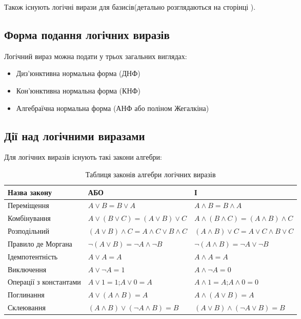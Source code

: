 Також існують логічні вирази для базисів(детально розглядаються на сторінці  \pageref{subsect:logic_basis}).
\newpage
\subsection{Форма подання логічних виразів}
Логічний вираз можна подати у трьох загальних виглядах:
\begin{itemize}
	\item Диз'юнктивна нормальна форма (ДНФ)
	\item Кон'юнктивна нормальна форма (КНФ)
	\item Алгебраїчна нормальна форма (АНФ або поліном Жегалкіна)
\end{itemize}
\newpage
\subsection{Дії над логічними виразами}
Для логічних виразів існують такі закони алгебри:
\begin{center}
\begin{table}[h!]
\begin{tabu} { | X[3,с] | X[3,c] | X[3,c] | }
 \hline
Назва закону& АБО & І \\
 \hline
 Переміщення &$A \lor B = B \lor A$  &$A \wedge B = B \wedge A $  \\
\hline
 Комбінування &$A \lor (B \lor C)= (A \lor B) \lor C $  &$A \wedge (B \wedge C)= (A \wedge B) \wedge C $  \\
\hline
Розподільний &$(A \lor B) \wedge C= A \wedge C \lor B \wedge C $  \vspace{1mm}&$(A \wedge B) \lor C= A \lor C \wedge B \lor C $ \vspace{1mm}   \\
\hline
Правило де Моргана & $\neg(A \lor B) = \neg A \wedge \neg B$& $\neg(A \wedge B) = \neg A \lor \neg B$\\
\hline
Ідемпотентність & $A \lor A = A$ &$A \wedge A = A $   \\
\hline
Виключення &$A \lor \neg A = 1$ & $A \wedge \neg A = 0$  \\
\hline
Операції з константами & $A \lor 1= 1$;$A \lor 0 = A$&$A \wedge 1 = A$;$A \wedge 0 = 0$  \\
\hline
Поглинання &$A \lor (A \wedge B) = A $ &$A \wedge (A \lor B) = A $   \\
\hline
Склеювання&$(A \wedge B) \lor (\neg A \wedge B)=B$&$(A \lor B) \wedge (\neg A \lor B)=B$   \\
\hline
\end{tabu}
\vspace{6mm}\\
\caption{Таблиця законів алгебри логічних виразів}\label{tab:logic_formulas}
\end{table}
\end{center}


